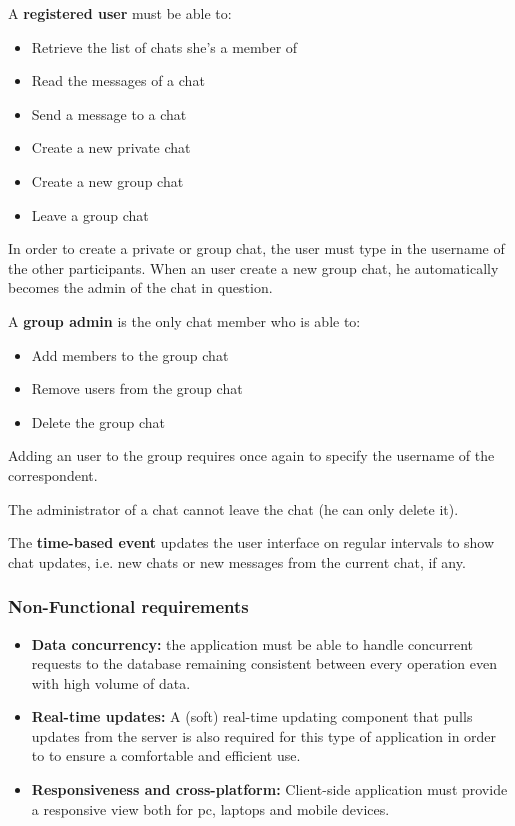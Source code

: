 \documentclass[10pt]{article}
\begin{document}
A \textbf{registered user} must be able to:
\begin{itemize}
    \item Retrieve the list of chats she's a member of
    \item Read the messages of a chat
    \item Send a message to a chat
    \item Create a new private chat
    \item Create a new group chat
    \item Leave a group chat
\end{itemize}

In order to create a private or group chat, the user must type in the username
of the other participants.
When an user create a new group chat, he automatically becomes the admin of the chat in question.

A \textbf{group admin} is the only chat member who is able to:
\begin{itemize}
    \item Add members to the group chat
    \item Remove users from the group chat
    \item Delete the group chat
\end{itemize}

Adding an user to the group requires once again to specify the username of the 
correspondent. 

The administrator of a chat cannot leave the chat (he can only delete it).

The \textbf{time-based event} updates the user interface on regular intervals
to show chat updates, i.e. new chats or new messages from the current chat, if any.

\subsubsection{Non-Functional requirements}
\begin{itemize}
	\item \textbf{Data concurrency:} the application must be able to handle concurrent requests to the database remaining consistent between every operation even with high volume of data. 
	
	\item \textbf{Real-time updates:} A (soft) real-time updating component that pulls updates from the server is also required for this type of application in order to to ensure a comfortable and efficient use.
	
	\item \textbf{Responsiveness and cross-platform:} Client-side application must provide a responsive view both for pc, laptops and mobile devices.
	
\end{itemize}
\end{document}
